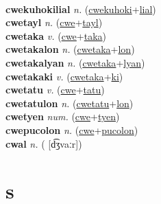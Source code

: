  \label{cwekuhokilon} \\
\textbf{cwekuhokilial} \textit{n.} (\hyperref[cwekuhoki]{cwekuhoki}+\hyperref[lial]{lial})
 \label{cwekuhokilial} \\
\textbf{cwetayl} \textit{n.} (\hyperref[cwe]{cwe}+\hyperref[tayl]{tayl})
 \label{cwetayl} \\
\textbf{cwetaka} \textit{v.} (\hyperref[cwe]{cwe}+\hyperref[taka]{taka})
 \label{cwetaka} \\
\textbf{cwetakalon} \textit{n.} (\hyperref[cwetaka]{cwetaka}+\hyperref[lon]{lon})
 \label{cwetakalon} \\
\textbf{cwetakalyan} \textit{n.} (\hyperref[cwetaka]{cwetaka}+\hyperref[lyan]{lyan})
 \label{cwetakalyan} \\
\textbf{cwetakaki} \textit{v.} (\hyperref[cwetaka]{cwetaka}+\hyperref[ki]{ki})
 \label{cwetakaki} \\
\textbf{cwetatu} \textit{v.} (\hyperref[cwe]{cwe}+\hyperref[tatu]{tatu})
 \label{cwetatu} \\
\textbf{cwetatulon} \textit{n.} (\hyperref[cwetatu]{cwetatu}+\hyperref[lon]{lon})
 \label{cwetatulon} \\
\textbf{cwetyen} \textit{num.} (\hyperref[cwe]{cwe}+\hyperref[tyen]{tyen})
 \label{cwetyen} \\
\textbf{cwepucolon} \textit{n.} (\hyperref[cwe]{cwe}+\hyperref[pucolon]{pucolon})
 \label{cwepucolon} \\
\textbf{cwal} \textit{n.} ( [d͡ʒvaːr])
 \label{cwal} 

\section{s}

